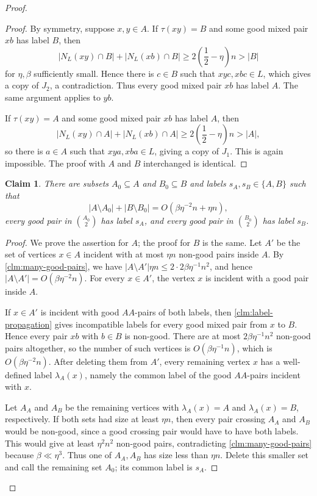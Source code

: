 \documentclass[10pt,a4paper]{amsart}
\newtheorem{claim}{Claim}
\begin{document}
\begin{proof}
\begin{proof}
By symmetry, suppose $x,y\in A$.  If $\tau(xy)=B$ and some good mixed pair $xb$ has label $B$, then
\[
|N_L(xy)\cap B|+|N_L(xb)\cap B|
\ge 2\left(\frac{1}{2}-\eta\right)n>|B|
\]
for $\eta,\beta$ sufficiently small.  Hence there is $c\in B$ such that $xyc,xbc\in L$, which gives a copy of $J_2$, a contradiction.  Thus every good mixed pair $xb$ has label $A$.  The same argument applies to $yb$.

If $\tau(xy)=A$ and some good mixed pair $xb$ has label $A$, then
\[
|N_L(xy)\cap A|+|N_L(xb)\cap A|
\ge 2\left(\frac{1}{2}-\eta\right)n>|A|,
\]
so there is $a\in A$ such that $xya,xba\in L$, giving a copy of $J_1$.  This is again impossible.  The proof with $A$ and $B$ interchanged is identical.
\end{proof}

\begin{claim}\label{clm:same-color-common-label}
There are subsets $A_0\subseteq A$ and $B_0\subseteq B$ and labels $s_A,s_B\in\{A,B\}$ such that
\[
|A\setminus A_0|+|B\setminus B_0|=O(\beta\eta^{-2}n+\eta n),
\]
every good pair in $\binom{A_0}{2}$ has label $s_A$, and every good pair in $\binom{B_0}{2}$ has label $s_B$.
\end{claim}

\begin{proof}
We prove the assertion for $A$; the proof for $B$ is the same.  Let $A'$ be the set of vertices $x\in A$ incident with at most $\eta n$ non-good pairs inside $A$.  By \cref{clm:many-good-pairs}, we have $|A\setminus A'|\eta n\le 2\cdot 2\beta\eta^{-1}n^2$, and hence $|A\setminus A'|=O(\beta\eta^{-2}n)$.
For every $x\in A'$, the vertex $x$ is incident with a good pair inside $A$.

If $x\in A'$ is incident with good $AA$-pairs of both labels, then \cref{clm:label-propagation} gives incompatible labels for every good mixed pair from $x$ to $B$.  Hence every pair $xb$ with $b\in B$ is non-good.  There are at most $2\beta\eta^{-1}n^2$ non-good pairs altogether, so the number of such vertices is $O(\beta\eta^{-1}n)$, which is $O(\beta\eta^{-2}n)$.  After deleting them from $A'$, every remaining vertex $x$ has a well-defined label $\lambda_A(x)$, namely the common label of the good $AA$-pairs incident with $x$.

Let $A_A$ and $A_B$ be the remaining vertices with $\lambda_A(x)=A$ and $\lambda_A(x)=B$, respectively.  If both sets had size at least $\eta n$, then every pair crossing $A_A$ and $A_B$ would be non-good, since a good crossing pair would have to have both labels.  This would give at least $\eta^2n^2$ non-good pairs, contradicting \cref{clm:many-good-pairs} because $\beta\ll\eta^3$.  Thus one of $A_A,A_B$ has size less than $\eta n$.  Delete this smaller set and call the remaining set $A_0$; its common label is $s_A$.
\end{proof}


\end{proof}
\end{document}
